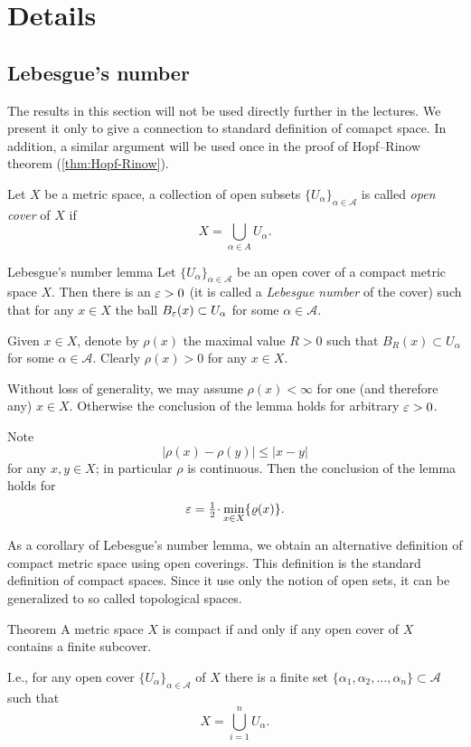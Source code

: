 \chapter{Details}

\section{Lebesgue's number}

The results in this section will not be used directly further in the lectures.
We present it only to give a connection to standard definition of comapct space.
In addition, a similar argument will be used once in the proof of Hopf--Rinow theorem (\ref{thm:Hopf-Rinow}).

\medskip

Let $X$ be a metric space, a collection of open subsets $\{U_\alpha\}_{\alpha\in\mathcal A}$ is called \emph{open cover} of $X$ if 
$$X=\bigcup_{\alpha\in A}U_\alpha.$$


\begin{thm}{Lebesgue's number lemma}\label{lem:lebesgue-number}
Let $\{U_\alpha\}_{\alpha\in\mathcal A}$ be an open cover of a compact metric space $X$.
Then there is an $\varepsilon>0$ (it is called a \emph{Lebesgue number} of the cover)
such that for any $x\in X$ the ball $B_\varepsilon(x)\subset U_\alpha$ for some $\alpha\in\mathcal{A}$.
\end{thm}

Given $x\in X$, denote by $\rho(x)$ the maximal value $R>0$ such that $B_R(x)\subset U_\alpha$ for some $\alpha\in\mathcal{A}$.
Clearly $\rho(x)>0$ for any $x\in X$.

Without loss of generality, we may assume $\rho(x)<\infty$ for one (and therefore any) $x\in X$.
Otherwise the conclusion of the lemma holds for arbitrary $\varepsilon>0$.

Note  $$|\rho(x)-\rho(y)|\le |x-y|$$ for any $x,y\in X$;
in particular $\rho$ is continuous.
Then the conclusion of the lemma holds for 
$$\eps=\tfrac12\cdot\min_{x\in X}\{\rho(x)\}.$$
\qedsf


As a corollary of Lebesgue's number lemma, 
we obtain an alternative definition of compact metric space using open coverings.
This definition is the standard definition of compact spaces.
Since it use only the notion of open sets, it can be generalized to so called topological spaces.


\begin{thm}{Theorem}\label{thm:compact+covering}
A metric space $X$ is compact if and only if any open cover of $X$ contains a finite subcover.

I.e., for any open cover $\{U_\alpha\}_{\alpha\in\mathcal A}$ of $X$ there is a finite set 
$\{\alpha_1,\alpha_2,\dots,\alpha_n\}\subset \mathcal A$ such that 
$$X=\bigcup_{i=1}^nU_\alpha.$$
 
\end{thm}

